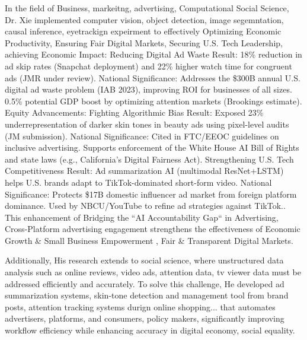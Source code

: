 \documentclass{article}
\begin{document}
In the field of Business, markeitng, advertising, Computational Social Science, Dr. Xie implemented computer vision, object detection, image segemntation, causal inference, eyetrackign expeirment to effectively Optimizing Economic Productivity,  Ensuring Fair Digital Markets, Securing U.S. Tech Leadership, achieving  Economic Impact: Reducing Digital Ad Waste Result:  18\% reduction in ad skip rates (Snapchat deployment) and 22\% higher watch time for congruent ads (JMR under review). National Significance:  Addresses the \$300B annual U.S. digital ad waste problem (IAB 2023), improving ROI for businesses of all sizes.  0.5\% potential GDP boost by optimizing attention markets (Brookings estimate). Equity Advancements: Fighting Algorithmic Bias Result:  Exposed 23\% underrepresentation of darker skin tones in beauty ads using pixel-level audits (JM submission). National Significance:  Cited in FTC/EEOC guidelines on inclusive advertising.  Supports enforcement of the White House AI Bill of Rights and state laws (e.g., California’s Digital Fairness Act). Strengthening U.S. Tech Competitiveness Result:  Ad summarization AI (multimodal ResNet+LSTM) helps U.S. brands adapt to TikTok-dominated short-form video. National Significance:  Protects \$17B domestic influencer ad market from foreign platform dominance.  Used by NBCU/YouTube to refine ad strategies against TikTok.. This enhancement of Bridging the ``AI Accountability Gap`` in Advertising, Cross-Platform advertising engagement strengthens the effectiveness of Economic Growth \& Small Business Empowerment ,  Fair \& Transparent Digital Markets.

Additionally, His research extends to social science, where unstructured data analysis such as online reviews, video ads, attention data, tv viewer data must be addressed efficiently and accurately. To solve this challenge, He developed ad summarization systems, skin-tone detection and management tool from brand posts, attention tracking systems durign online shopping... that automates advertisers, platforms, and consumers, policy makers, significantly improving workflow efficiency while enhancing accuracy in digital economy, social equality.
\end{document}
